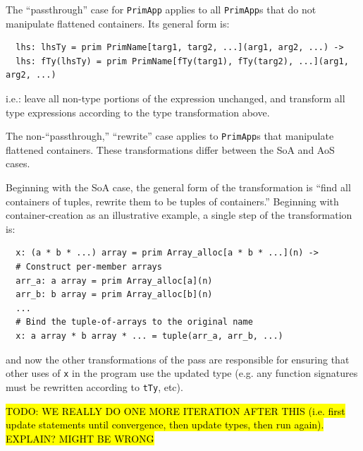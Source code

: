 \documentclass[leqno,11pt]{article}
\begin{document}
The ``passthrough'' case for \texttt{PrimApp} applies to all \texttt{PrimApp}s
that do not manipulate flattened containers. Its general form is:
\begin{verbatim}
  lhs: lhsTy = prim PrimName[targ1, targ2, ...](arg1, arg2, ...) ->
  lhs: fTy(lhsTy) = prim PrimName[fTy(targ1), fTy(targ2), ...](arg1, arg2, ...)
\end{verbatim}
i.e.: leave all non-type portions of the expression unchanged, and transform all
type expressions according to the type transformation above.

The non-``passthrough,'' ``rewrite'' case applies to \texttt{PrimApp}s that
manipulate flattened containers. These transformations differ between the SoA
and AoS cases.

Beginning with the SoA case, the general form of the transformation is ``find
all containers of tuples, rewrite them to be tuples of containers.'' Beginning
with container-creation as an illustrative example, a single step of the
transformation is:
\begin{verbatim}
  x: (a * b * ...) array = prim Array_alloc[a * b * ...](n) ->
  # Construct per-member arrays
  arr_a: a array = prim Array_alloc[a](n)
  arr_b: b array = prim Array_alloc[b](n)
  ...
  # Bind the tuple-of-arrays to the original name
  x: a array * b array * ... = tuple(arr_a, arr_b, ...)
\end{verbatim}
and now the other transformations of the pass are responsible for ensuring that
other uses of \texttt{x} in the program use the updated type (e.g. any function
signatures must be rewritten according to \texttt{tTy}, etc).

\hl{TODO: WE REALLY DO ONE MORE ITERATION AFTER THIS (i.e. first update
  statements until convergence, then update types, then run again). EXPLAIN?
  MIGHT BE WRONG}
\end{document}
